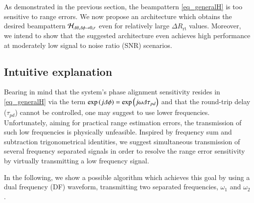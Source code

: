 As demonstrated in the previous section, the beampattern \eqref{eq_generalH} is too sensitive to range errors.
We now propose an architecture which obtains the desired beampattern $\mathcal{H}_{\Delta\theta,\Delta\phi\to0,r}$ even for relatively large $\Delta R_{\text{rt}}$ values. Moreover, we intend to show that the suggested architecture even achieves high performance at moderately low signal to noise ratio (SNR) scenarios.

\subsection*{Intuitive explanation}
Bearing in mind that the system's phase alignment sensitivity resides in \eqref{eq_generalH} via the  term $\exp\Brack{j\dPhi}=\exp\Brack{j\omega\Delta\tau_{pd}}$ and that the round-trip delay ($\tau_{pd}$) cannot be controlled, one may suggest to use lower frequencies. 
Unfortunately, aiming for practical range estimation errors, the transmission of such low frequencies is physically unfeasible. 
Inspired by frequency sum and subtraction trigonometrical identities, we suggest simultaneous transmission of several frequency separated signals in order to resolve the range error sensitivity by virtually transmitting a low frequency signal.
\par In the following, we show a possible algorithm which achieves this goal by using a dual frequency (DF) waveform, transmitting two separated frequencies, $\omega_1$ and $\omega_2$.

